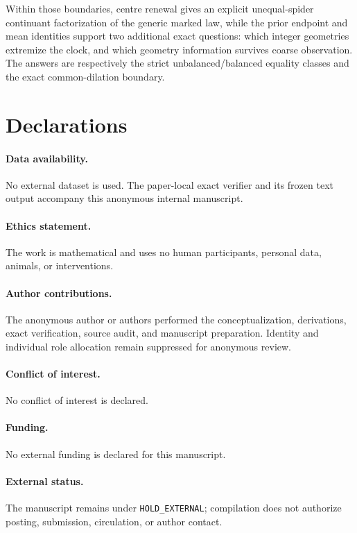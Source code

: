 \documentclass[a4paper,10pt]{amsart}
\theoremstyle{remark}
\begin{document}
Within those boundaries, centre renewal gives an explicit unequal-spider
continuant factorization of the generic marked law, while the prior endpoint
and mean identities
support two additional exact questions: which integer geometries extremize
the clock, and which geometry information survives coarse observation.  The
answers are respectively the strict unbalanced/balanced equality classes and
the exact common-dilation boundary.

\section*{Declarations}

\paragraph{Data availability.}
No external dataset is used.  The paper-local exact verifier and its frozen
text output accompany this anonymous internal manuscript.

\paragraph{Ethics statement.}
The work is mathematical and uses no human participants, personal data,
animals, or interventions.

\paragraph{Author contributions.}
The anonymous author or authors performed the conceptualization, derivations,
exact verification, source audit, and manuscript preparation.  Identity and
individual role allocation remain suppressed for anonymous review.

\paragraph{Conflict of interest.}
No conflict of interest is declared.

\paragraph{Funding.}
No external funding is declared for this manuscript.

\paragraph{External status.}
The manuscript remains under \texttt{HOLD\_EXTERNAL}; compilation does not
authorize posting, submission, circulation, or author contact.



\end{document}
